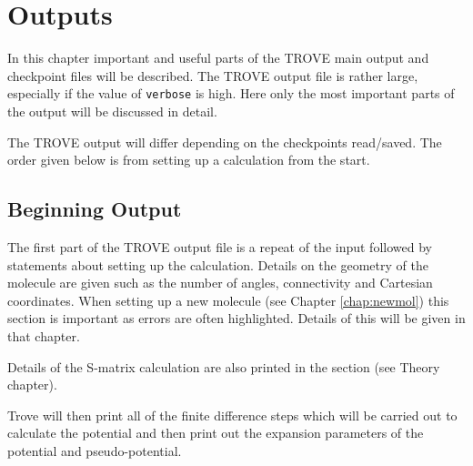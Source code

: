 
\chapter{Outputs}
\label{chap:outputs}

In this chapter important and useful parts of the TROVE main output and checkpoint files will be described. The TROVE 
output file is rather large, especially if the value of \verb|verbose| is high. Here only the most important parts of the 
output will be discussed in detail.

The TROVE output will differ depending on the checkpoints read/saved. The order given below is from setting up a calculation
from the start. 

\section{Beginning Output}

The first part of the TROVE output file is a repeat of the input followed by statements about setting up the 
calculation. Details on the geometry of the molecule are given such as the number of angles, connectivity and 
Cartesian coordinates. When setting up a new molecule (see Chapter \ref{chap:newmol}) this section is important as errors are
often highlighted. Details of this will be given in that chapter.

Details of the S-matrix calculation are also printed in the section (see Theory chapter).

Trove will then print all of the finite difference steps which will be carried out to calculate the potential and then
print out the expansion parameters of the potential and pseudo-potential. 



